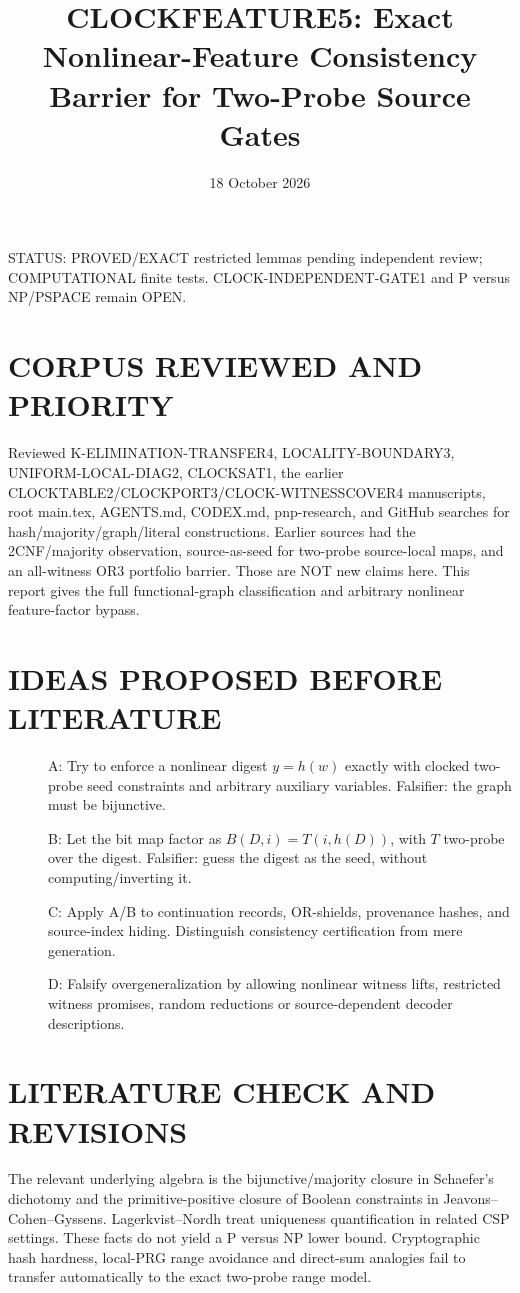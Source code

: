 \documentclass[11pt]{article}
\title{CLOCKFEATURE5: Exact Nonlinear-Feature Consistency Barrier for Two-Probe Source Gates}
\date{18 October 2026}
\begin{document}
\maketitle
\noindent STATUS: PROVED/EXACT restricted lemmas pending independent review; COMPUTATIONAL finite tests. CLOCK-INDEPENDENT-GATE1 and P versus NP/PSPACE remain OPEN.

\section{CORPUS REVIEWED AND PRIORITY}
Reviewed K-ELIMINATION-TRANSFER4, LOCALITY-BOUNDARY3, UNIFORM-LOCAL-DIAG2, CLOCKSAT1, the earlier CLOCKTABLE2/CLOCKPORT3/CLOCK-WITNESSCOVER4 manuscripts, root main.tex, AGENTS.md, CODEX.md, pnp-research, and GitHub searches for hash/majority/graph/literal constructions. Earlier sources had the 2CNF/majority observation, source-as-seed for two-probe source-local maps, and an all-witness OR3 portfolio barrier. Those are NOT new claims here. This report gives the full functional-graph classification and arbitrary nonlinear feature-factor bypass.

\section{IDEAS PROPOSED BEFORE LITERATURE}
\begin{description}
\item[] A: Try to enforce a nonlinear digest $y=h(w)$ exactly with clocked two-probe seed constraints and arbitrary auxiliary variables. Falsifier: the graph must be bijunctive.
\item[] B: Let the bit map factor as $B(D,i)=T(i,h(D))$, with $T$ two-probe over the digest. Falsifier: guess the digest as the seed, without computing/inverting it.
\item[] C: Apply A/B to continuation records, OR-shields, provenance hashes, and source-index hiding. Distinguish consistency certification from mere generation.
\item[] D: Falsify overgeneralization by allowing nonlinear witness lifts, restricted witness promises, random reductions or source-dependent decoder descriptions.
\end{description}

\section{LITERATURE CHECK AND REVISIONS}
The relevant underlying algebra is the bijunctive/majority closure in Schaefer's dichotomy and the primitive-positive closure of Boolean constraints in Jeavons--Cohen--Gyssens. Lagerkvist--Nordh treat uniqueness quantification in related CSP settings. These facts do not yield a P versus NP lower bound. Cryptographic hash hardness, local-PRG range avoidance and direct-sum analogies fail to transfer automatically to the exact two-probe range model.
\end{document}
